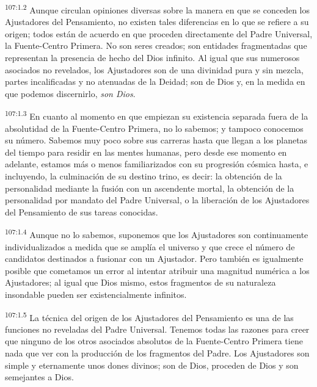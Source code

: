\documentclass[twoside, 11pt]{book}
\begin{document}
\par
\textsuperscript{107:1.2} Aunque circulan opiniones diversas sobre la manera en que se conceden los Ajustadores del Pensamiento, no existen tales diferencias en lo que se refiere a su origen; todos están de acuerdo en que proceden directamente del Padre Universal, la Fuente-Centro Primera. No son seres creados; son entidades fragmentadas que representan la presencia de hecho del Dios infinito. Al igual que sus numerosos asociados no revelados, los Ajustadores son de una divinidad pura y sin mezcla, partes incalificadas y no atenuadas de la Deidad; son de Dios y, en la medida en que podemos discernirlo, \textit{son Dios}.

\par
\textsuperscript{107:1.3} En cuanto al momento en que empiezan su existencia separada fuera de la absolutidad de la Fuente-Centro Primera, no lo sabemos; y tampoco conocemos su número. Sabemos muy poco sobre sus carreras hasta que llegan a los planetas del tiempo para residir en las mentes humanas, pero desde ese momento en adelante, estamos más o menos familiarizados con su progresión cósmica hasta, e incluyendo, la culminación de su destino trino, es decir: la obtención de la personalidad mediante la fusión con un ascendente mortal, la obtención de la personalidad por mandato del Padre Universal, o la liberación de los Ajustadores del Pensamiento de sus tareas conocidas.

\par
\textsuperscript{107:1.4} Aunque no lo sabemos, suponemos que los Ajustadores son continuamente individualizados a medida que se amplía el universo y que crece el número de candidatos destinados a fusionar con un Ajustador. Pero también es igualmente posible que cometamos un error al intentar atribuir una magnitud numérica a los Ajustadores; al igual que Dios mismo, estos fragmentos de su naturaleza insondable pueden ser existencialmente infinitos.

\par
\textsuperscript{107:1.5} La técnica del origen de los Ajustadores del Pensamiento es una de las funciones no reveladas del Padre Universal. Tenemos todas las razones para creer que ninguno de los otros asociados absolutos de la Fuente-Centro Primera tiene nada que ver con la producción de los fragmentos del Padre. Los Ajustadores son simple y eternamente unos dones divinos; son de Dios, proceden de Dios y son semejantes a Dios.
\end{document}

